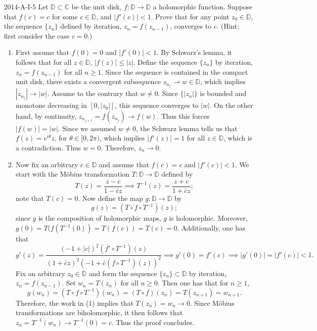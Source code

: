 \documentclass{article}
\begin{document}
	\begin{prb}{2014-A-I-5}
		Let $\mathbb{D} \subset \mathbb{C}$ be the unit disk, $f: \mathbb{D} \to \mathbb{D}$ a holomorphic function. Suppose that $f(c) = c$ for some $c \in\mathbb{D}$, and $|f'(c)| < 1$. Prove that for any point $z_{0} \in \mathbb{D}$, the sequence $\{z_{n}\}$ defined by iteration, $z_{n} = f(z_{n-1})$, converges to $c$. (Hint: first consider the case $c = 0$.)
	\end{prb}
	\begin{enumerate}[itemsep =-2pt,label = (\arabic{*})]
		\item First assume that $f(0) = 0$ and $|f'(0)| < 1$. By Schwarz's lemma, it follows that for all $z \in\mathbb{D}$, $|f(z)| \leq |z|$. Define the sequence $\{z_{n}\}$ by iteration, $z_{n} = f(z_{n-1})$ for all $n \geq 1$. Since the sequence is contained in the compact unit disk, there exists a convergent subsequence $z_{n_{j}} \to w \in \mathbb{D}$, which implies $|z_{n_{j}}| \to |w|$. Assume to the contrary that $w \neq 0$. Since $\{|z_{n}|\}$ is bounded and monotone decreasing in $[0, |z_{0}|]$, this sequence converges to $|w|$. On the other hand, by continuity, $z_{n_{j + 1}} = f(z_{n_{j}}) \to f(w)$. Thus this forces $|f(w)| = |w|$. Since we assumed $w \neq 0$, the Schwarz lemma tells us that $f(z) = e^{i\theta}z$, for $\theta \in [0,2\pi)$, which implies $|f'(z)| = 1$ for all $z \in \mathbb{D}$, which is a contradiction. Thus $w = 0$. Therefore, $z_{n} \to 0$. 
		\item Now fix an arbitrary $c \in \mathbb{D}$ and assume that $f(c) = c$ and $|f'(c)| < 1$. We start with the M\"obius transformation $T: \mathbb{D} \to \mathbb{D}$ defined by 
		\begin{equation*}
			T(z) = \frac{z - c}{1 - \bar{c}z} \implies T^{-1}(z) = \frac{z + c}{1 + \bar{c}z};
		\end{equation*}
		note that $T(c) = 0$. Now define the map $g: \mathbb{D} \to \mathbb{D}$ by 
		\begin{equation*}
			g(z) = (T \circ f \circ T^{-1})(z); 
		\end{equation*}
		since $g$ is the composition of holomorphic maps, $g$ is holomorphic. Moreover, $g(0) = T(f(T^{-1}(0)) = T(f(c)) = T(c) = 0$. Additionally, one has that 
		\begin{equation*}
			g'(z) = \frac{(-1 + |c|)^{2}(f' \circ T^{-1})(z)}{(1 + \bar{c}z)^{2}(-1 + \bar{c}(f \circ T^{-1})(z))^{2}} \implies g'(0) = f'(c) \implies |g'(0)| = |f'(c)| < 1. 
		\end{equation*}
		Fix an arbitrary $z_{0} \in \mathbb{D}$ and form the sequence $\{z_{n}\} \subset \mathbb{D}$ by iteration, $z_{n} = f(z_{n-1})$. Set $w_{n} = T(z_{n})$ for all $n \geq 0$. Then one has that for $n \geq 1$,
		\begin{equation*}
			g(w_{n}) = (T \circ f \circ T^{-1})(w_{n}) = (T \circ f)(z_{n}) = T(z_{n + 1}) = w_{n + 1}. 
		\end{equation*}
		Therefore, the work in (1) implies that $T(z_{n}) = w_{n} \to 0$. Since M\"obius transformations are biholomorphic, it then follows that $z_{n} = T^{-1}(w_{n}) \to T^{-1}(0) = c$. Thus the proof concludes. 
	\end{enumerate}
	
\end{document}
